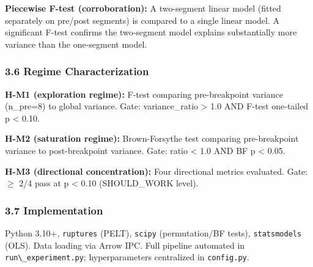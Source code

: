 \textbf{Piecewise F-test (corroboration):} A two-segment linear model (fitted separately on pre/post segments) is compared to a single linear model. A significant F-test confirms the two-segment model explains substantially more variance than the one-segment model.

\subsubsection{3.6 Regime Characterization}

\textbf{H-M1 (exploration regime):} F-test comparing pre-breakpoint variance (n\_pre=8) to global variance. Gate: variance\_ratio > 1.0 AND F-test one-tailed p < 0.10.

\textbf{H-M2 (saturation regime):} Brown-Forsythe test comparing pre-breakpoint variance to post-breakpoint variance. Gate: ratio < 1.0 AND BF p < 0.05.

\textbf{H-M3 (directional concentration):} Four directional metrics evaluated. Gate: $\geq$ 2/4 pass at p < 0.10 (SHOULD\_WORK level).

\subsubsection{3.7 Implementation}

Python 3.10+, \texttt{ruptures} (PELT), \texttt{scipy} (permutation/BF tests), \texttt{statsmodels} (OLS). Data loading via Arrow IPC. Full pipeline automated in \texttt{run\textbackslash \_experiment.py}; hyperparameters centralized in \texttt{config.py}.


